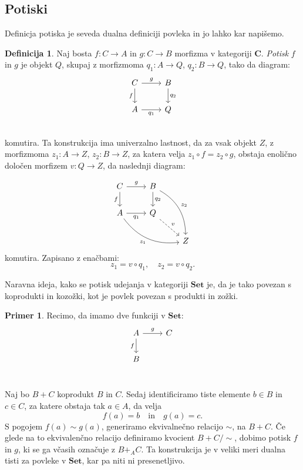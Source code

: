 \documentclass[12pt,a4paper]{book}
\theoremstyle{definition}
\newtheorem{definicija}{Definicija}[chapter]
\theoremstyle{plain}
\theoremstyle{definition}
\newtheorem{primer}{Primer}[section]
\theoremstyle{remark}
\newcommand{\cat}[1]{\textbf{#1}}
\begin{document}
\subsection{Potiski}

Definicja potiska je seveda dualna definiciji povleka in jo lahko kar napišemo.

\begin{definicija}
Naj bosta $f: C \to A$ in $g : C \to B$ morfizma v kategoriji $\cat{C}$. \emph{Potisk} $f$ in $g$ je objekt $Q$, skupaj z morfizmoma $q_1 : A \to Q$, $q_2 : B \to Q$, tako da diagram:
$$\begin{tikzcd}
C \ar[r, "g"] \ar[d, "f"'] & B \ar[d, "q_2"] \\
A \ar[r, "q_1"'] & Q \\
\end{tikzcd}$$
komutira. Ta konstrukcija ima univerzalno lastnost, da za vsak objekt $Z$, z morfizmoma $z_1 : A \to Z$, $z_2 : B \to Z$, za katera velja $z_1 \circ f = z_2 \circ g$, obstaja enolično določen morfizem $v : Q \to Z$, da naslednji diagram:

$$\begin{tikzcd}
C \ar[r, "g"] \ar[d, "f"'] & B \ar[d, "q_2"] \ar[ddr, bend left, "z_2"] & \\
A \ar[r, "q_1"'] \ar[drr, bend right, "z_1"'] & Q \ar[dr, dashed, "v"] & \\
& & Z 
\end{tikzcd}$$
komutira. Zapisano z enačbami:
$$z_1 = v \circ  q_1, \quad z_2 = v \circ q_2.$$
\end{definicija}

Naravna ideja, kako se potisk udejanja v kategoriji $\cat{Set}$ je, da je tako povezan s koprodukti in kozožki, kot je povlek povezan s produkti in zožki.

\begin{primer}
Recimo, da imamo dve funkciji v $\cat{Set}$:
$$ \begin{tikzcd}
A \ar[d, "f"'] \ar[r, "g"] & C \\
B & \\
\end{tikzcd} $$

Naj bo $B + C$ koprodukt $B$ in $C$. Sedaj identificiramo tiste elemente $b \in B$ in $c \in C$, za katere obstaja tak $a \in A$, da velja
$$f(a) = b \quad \text{in} \quad g(a) = c.$$
S pogojem $f(a) \sim g(a)$, generiramo ekvivalnečno relacijo $\sim$, na $B + C$. Če glede na to ekvivalenčno relacijo definiramo kvocient $B + C/\sim$, dobimo potisk $f$ in $g$, ki se ga včasih označuje z $B +_A C$. Ta konstrukcija je v veliki meri dualna tisti za povleke v $\cat{Set}$, kar pa niti ni presenetljivo.

\end{primer}
\end{document}
